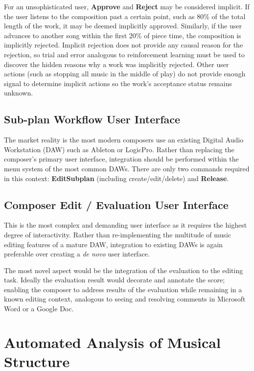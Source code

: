 \documentclass[final,authoryear,5p,times,twocolumn]{elsarticle}
\begin{document}
For an unsophisticated user, \textbf{Approve} and \textbf{Reject} may be considered implicit. If the user listens to the composition past a certain point, such as 80\% of the total length of the work, it may be deemed implicitly approved. Similarly, if the user advances to another song within the first 20\% of piece time, the composition is implicitly rejected. Implicit rejection does not provide any causal reason for the rejection, so trial and error analogous to reinforcement learning must be used to discover the hidden reasons why a work was implicitly rejected. Other user actions (such as stopping all music in the middle of play) do not provide enough signal to determine implicit actions so the work's acceptance status remains unknown.

\subsection{Sub-plan Workflow User Interface}

The market reality is the most modern composers use an existing Digital Audio Workstation (DAW) such as Ableton or LogicPro. Rather than replacing the composer's primary user interface, integration should be performed within the menu system of the most common DAWs. There are only two commands required in this context: \textbf{EditSubplan} (including create/edit/delete) and \textbf{Release}. 

\subsection{Composer Edit / Evaluation User Interface}

This is the most complex and demanding user interface as it requires the highest degree of interactivity. Rather than re-implementing the multitude of music editing features of a mature DAW, integration to existing DAWs is again preferable over creating a \textit{de novo} user interface. 

The most novel aspect would be the integration of the evaluation to the editing task. Ideally the evaluation result would decorate and annotate the score; enabling the composer to address results of the evaluation while remaining in a known editing context, analogous to seeing and resolving comments in Microsoft Word or a Google Doc.

\section{Automated Analysis of Musical Structure}
\label{sec:analysis}
\end{document}

